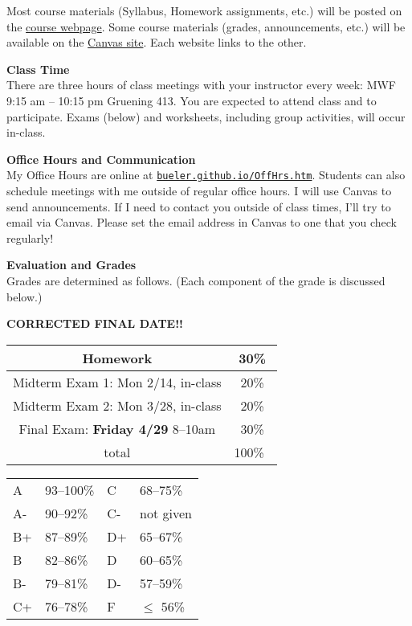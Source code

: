 \documentclass[12pt]{article}
\renewcommand{\emph}[1]{\textsf{\textbf{#1}}}
\newcommand{\localhead}[1]{\par\smallskip\textbf{#1} \smallskip\nobreak\\}%
\def\heading#1{\localhead{\large\emph{#1}}}
\begin{document}
Most course materials (Syllabus, Homework assignments, etc.) will be posted on the \href{https://bueler.github.io/math314/}{course webpage}.  Some course materials (grades, announcements, etc.) will be available on the \href{https://canvas.alaska.edu/courses/7017}{Canvas site}.  Each website links to the other.


\heading{Class Time}
There are three hours of class meetings with your instructor every week: MWF 9:15 am -- 10:15 pm  Gruening 413.  You are expected to attend class and to participate.  Exams (below) and worksheets, including group activities, will occur in-class.


\clearpage\newpage
\phantom{foo}

\heading{Office Hours and Communication}
My Office Hours are online at \href{http://bueler.github.io/OffHrs.htm}{\texttt{bueler.github.io/OffHrs.htm}}.  Students can also schedule meetings with me outside of regular office hours.  I will use Canvas to send announcements.  If I need to contact you outside of class times, I'll try to email via Canvas.  Please set the email address in Canvas to one that you check regularly!


\heading{Evaluation and Grades}
Grades are determined as follows.  (Each component of the grade is discussed below.)

\noindent \emph{CORRECTED FINAL DATE!!}

\begin{multicols}{2}
\begin{tabular}{|c|c|}
\hline
Homework & 30\% \\
\hline
Midterm Exam 1: Mon 2/14, in-class & 20\% \\
\hline
Midterm Exam 2: Mon 3/28, in-class & 20\%  \\
\hline
Final Exam: \emph{Friday 4/29} 8--10am & 30\% \\
\hline
total & 100\% \, \\
\hline
\end{tabular}

\begin{tabular}{llll}
A  & 93--100\%& C  & 68--75\%  \\
A- & 90--92\% & C- & not given \\
B+ & 87--89\% & D+ & 65--67\%  \\
B  & 82--86\% & D  & 60--65\%  \\
B- & 79--81\% & D- & 57--59\%  \\
C+ & 76--78\% & F  & $\le$ 56\%
\end{tabular}
\end{multicols}
\end{document}
